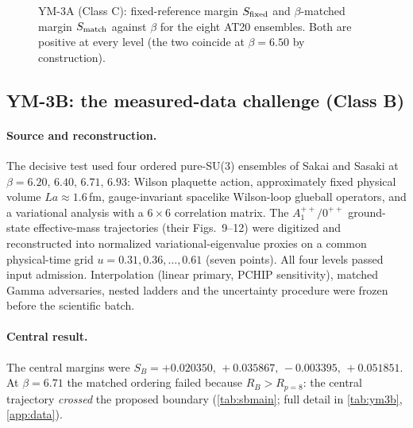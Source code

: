 \documentclass[11pt,a4paper]{article}
\theoremstyle{definition}
\theoremstyle{remark}
\begin{document}
\begin{figure}[t]
\centering
{}
\caption{YM-3A (Class C): fixed-reference margin $S_{\rm fixed}$ and $\beta$-matched margin $S_{\rm match}$ against $\beta$ for the eight AT20 ensembles. Both are positive at every level (the two coincide at $\beta=6.50$ by construction).}\label{fig:ym3a}
\end{figure}

\subsection{YM-3B: the measured-data challenge (Class B)}
\paragraph{Source and reconstruction.} The decisive test used four ordered pure-SU(3) ensembles of Sakai and Sasaki \cite{SS23} at $\beta=6.20,\,6.40,\,6.71,\,6.93$: Wilson plaquette action, approximately fixed physical volume $La\approx1.6$\,fm, gauge-invariant spacelike Wilson-loop glueball operators, and a variational analysis with a $6\times6$ correlation matrix. The $A_1^{++}/0^{++}$ ground-state effective-mass trajectories (their Figs.~9--12) were digitized and reconstructed into normalized variational-eigenvalue proxies on a common physical-time grid $u=0.31,0.36,\dots,0.61$ (seven points). All four levels passed input admission. Interpolation (linear primary, PCHIP sensitivity), matched Gamma adversaries, nested ladders and the uncertainty procedure were frozen before the scientific batch.

\paragraph{Central result.} The central margins were $S_B=+0.020350,\,+0.035867,\,-0.003395,\,+0.051851$. At $\beta=6.71$ the matched ordering failed because $R_B>R_{p=8}$: the central trajectory \emph{crossed} the proposed boundary (\cref{tab:sbmain}; full detail in \cref{tab:ym3b}, \cref{app:data}).
\end{document}
